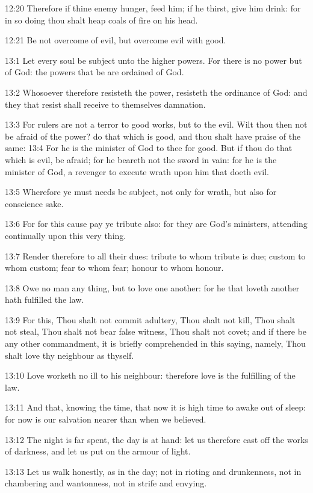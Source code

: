 12:20 Therefore if thine enemy hunger, feed him; if he thirst, give
him drink: for in so doing thou shalt heap coals of fire on his head.

12:21 Be not overcome of evil, but overcome evil with good.

13:1 Let every soul be subject unto the higher powers. For there is no
power but of God: the powers that be are ordained of God.

13:2 Whosoever therefore resisteth the power, resisteth the ordinance
of God: and they that resist shall receive to themselves damnation.

13:3 For rulers are not a terror to good works, but to the evil. Wilt
thou then not be afraid of the power? do that which is good, and thou
shalt have praise of the same: 13:4 For he is the minister of God to
thee for good. But if thou do that which is evil, be afraid; for he
beareth not the sword in vain: for he is the minister of God, a
revenger to execute wrath upon him that doeth evil.

13:5 Wherefore ye must needs be subject, not only for wrath, but also
for conscience sake.

13:6 For for this cause pay ye tribute also: for they are God's
ministers, attending continually upon this very thing.

13:7 Render therefore to all their dues: tribute to whom tribute is
due; custom to whom custom; fear to whom fear; honour to whom honour.

13:8 Owe no man any thing, but to love one another: for he that loveth
another hath fulfilled the law.

13:9 For this, Thou shalt not commit adultery, Thou shalt not kill,
Thou shalt not steal, Thou shalt not bear false witness, Thou shalt
not covet; and if there be any other commandment, it is briefly
comprehended in this saying, namely, Thou shalt love thy neighbour as
thyself.

13:10 Love worketh no ill to his neighbour: therefore love is the
fulfilling of the law.

13:11 And that, knowing the time, that now it is high time to awake
out of sleep: for now is our salvation nearer than when we believed.

13:12 The night is far spent, the day is at hand: let us therefore
cast off the works of darkness, and let us put on the armour of light.

13:13 Let us walk honestly, as in the day; not in rioting and
drunkenness, not in chambering and wantonness, not in strife and
envying.

